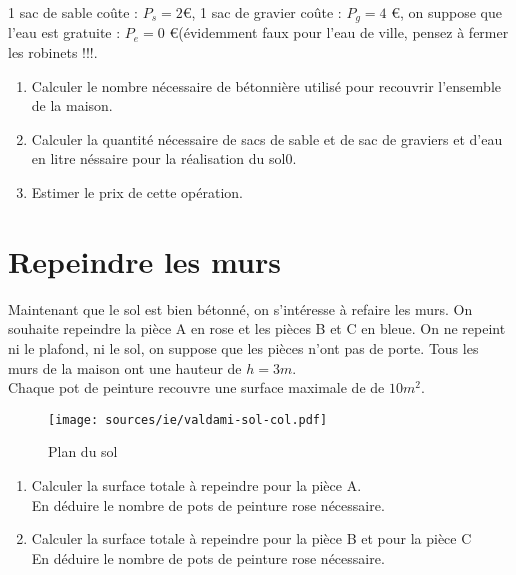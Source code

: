 \documentclass[11pt]{article}
\begin{document}
1 sac de sable coûte : $P_s = 2$\euro, 1 sac de gravier coûte : $P_g = 4$  \euro, on suppose que l'eau est gratuite : $P_e = 0$ \euro(évidemment faux pour l'eau de ville, pensez à fermer les robinets !!!.

\begin{enumerate}
\item Calculer le nombre nécessaire de bétonnière utilisé pour recouvrir l'ensemble de la maison.\\
  
\item Calculer la quantité nécessaire de sacs de sable et de sac de graviers et d'eau en litre néssaire pour la réalisation du sol0.\\

\item Estimer le prix de cette opération.\\

\end{enumerate} %


\section{Repeindre les murs}
Maintenant que le sol est bien bétonné, on s'intéresse à refaire les murs. On souhaite repeindre la pièce A en rose et les pièces B et C en bleue. On ne repeint ni le plafond, ni le sol, on suppose que les pièces n'ont pas de porte. Tous les murs de la maison ont une hauteur de $h=3m$.\\
Chaque pot de peinture recouvre une surface maximale de de $10m^2$. 

\begin{figure}[H]
  \centering
  \texttt{[image: sources/ie/valdami-sol-col.pdf]}
  \caption{Plan du sol}
  \label{fig:ch1-plan}
\end{figure}

\begin{enumerate}
\item Calculer la surface totale à repeindre pour la pièce A.\\
  En déduire le nombre de pots de peinture rose nécessaire.\\
\item Calculer la surface totale à repeindre pour la pièce B et pour la pièce C\\
  En déduire le nombre de pots de peinture rose nécessaire.\\
\end{enumerate}
\end{document}
